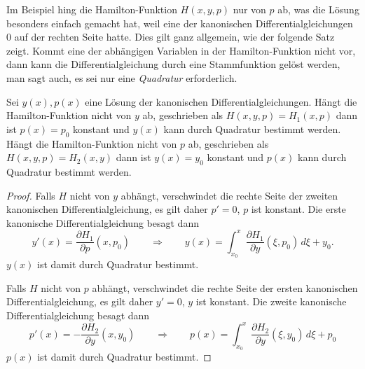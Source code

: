 Im Beispiel hing die Hamilton-Funktion $H(x,y,p)$ nur von $p$ ab,
was die Lösung besonders einfach gemacht hat, weil eine der kanonischen
Differentialgleichungen $0$ auf der rechten Seite hatte.
Dies gilt ganz allgemein, wie der folgende Satz zeigt.
Kommt eine der abhängigen Variablen in der Hamilton-Funktion nicht vor,
dann kann die Differentialgleichung durch eine Stammfunktion
gelöst werden, man sagt auch, es sei nur eine {\em Quadratur}
erforderlich.

\begin{satz}
Sei $y(x),p(x)$ eine Lösung der kanonischen Differentialgleichungen.
Hängt die Hamilton-Funktion nicht von $y$ ab, geschrieben als
$H(x,y,p)=H_1(x,p)$ dann ist $p(x)=p_0$ konstant und
$y(x)$ kann durch Quadratur bestimmt werden.
Hängt die Hamilton-Funktion nicht von $p$ ab, geschrieben als
$H(x,y,p)=H_2(x,y)$ dann ist $y(x)=y_0$ konstant und
$p(x)$ kann durch Quadratur bestimmt werden.
\end{satz}

\begin{proof}
Falls $H$ nicht von $y$ abhängt, verschwindet die rechte Seite der
zweiten kanonischen Differentialgleichung, es gilt daher $p'=0$,
$p$ ist konstant.
Die erste kanonische Differentialgleichung besagt dann
\[
y'(x)
=
\frac{\partial H_1}{\partial p}(x,p_0)
\qquad\Rightarrow\qquad
y(x)
=
\int_{x_0}^x
\frac{\partial H_1}{\partial y}(\xi,p_0)
\,d\xi
+ y_0.
\]
$y(x)$ ist damit durch Quadratur bestimmt.

Falls $H$ nicht von $p$ abhängt, verschwindet die rechte Seite
der ersten kanonischen Differentialgleichung, es gilt daher $y'=0$,
$y$ ist konstant.
Die zweite kanonische Differentialgleichung besagt dann
\[
p'(x)
=
-
\frac{\partial H_2}{\partial y}(x,y_0)
\qquad\Rightarrow\qquad
p(x)
=
\int_{x_0}^x
\frac{\partial H_2}{\partial y}(\xi,y_0)
\,d\xi
+
p_0
\]
$p(x)$ ist damit durch Quadratur bestimmt.
\end{proof}

%
%
